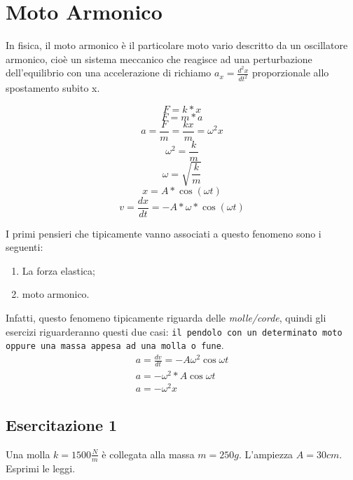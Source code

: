 \section{Moto Armonico}
In fisica, il moto armonico è il particolare moto vario descritto da un
oscillatore armonico, cioè un sistema meccanico che reagisce ad una
perturbazione dell'equilibrio con una accelerazione di richiamo
$a_{x}=\frac{d^{2}x}{dt^{2}}$ proporzionale allo spostamento subito x.

\begin{multicols}{2}
	\begin{equation*}
		F=k*x
	\end{equation*}
	\begin{equation*}
		F=m*a
	\end{equation*}
	\begin{equation*}
		a=\frac{F}{m}=\frac{kx}{m}=\omega^2x
	\end{equation*}
	\begin{equation*}
		\omega^2=\frac{k}{m}
	\end{equation*}
	\begin{equation*}
		\omega=\sqrt{\frac{k}{m}}
	\end{equation*}
	\begin{equation*}
		x=A*\cos (\omega t)
	\end{equation*}
	\begin{equation*}
		v=\frac{dx}{dt}=-A*\omega*\cos (\omega t)
	\end{equation*}
\end{multicols}
I primi pensieri che tipicamente vanno associati a questo fenomeno sono i
seguenti:
\begin{enumerate}
	\item La forza elastica;
	\item moto armonico.
\end{enumerate}
Infatti, questo fenomeno tipicamente riguarda delle \textit{molle/corde},
quindi gli esercizi riguarderanno questi due casi: \texttt{il pendolo con un
determinato moto oppure una massa appesa ad una molla o fune}.
\begin{equation*}
	\boxed{
		\begin{matrix}
			a=\frac{dv}{dt}=-A\omega^2\cos\omega t\\
			a=-\omega^2*A\cos\omega t\\
			a=-\omega^2x
		\end{matrix}
	}
\end{equation*}
\subsection{Esercitazione 1}
Una molla $k=1500\frac{N}{m}$ è collegata alla massa $m=250g$. L'ampiezza
$A=30cm$. Esprimi le leggi.

